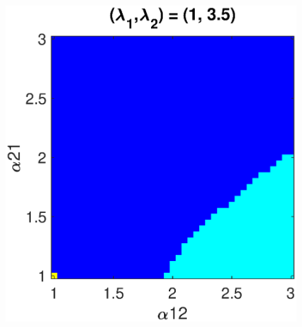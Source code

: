 \begin{figure}[h]
\begin{minipage}{0.32\linewidth}
  \end{minipage} 
   \begin{minipage}{0.32\linewidth}
  \begin{center}
\includegraphics[width=1\linewidth]{Images/photo24_3.eps}
\end{center}
  \end{minipage} 
  

\end{figure}
